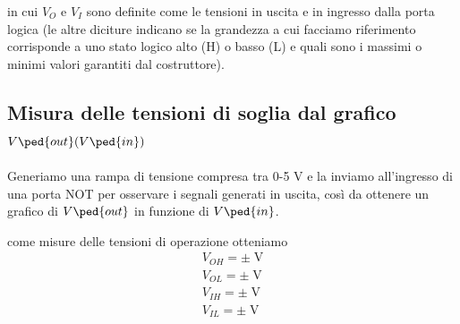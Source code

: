 \documentclass[10pt, a4paper, italian]{article}
\begin{document}
in cui $V_O$ e $V_I$ sono definite come le tensioni in uscita e in ingresso
dalla porta logica (le altre diciture indicano se la grandezza a cui facciamo
riferimento corrisponde a uno stato logico alto (H) o basso (L) e quali sono
i massimi o minimi valori garantiti dal costruttore).

\subsection{Misura delle tensioni di soglia dal grafico
$V\ped{out}(V\ped{in})$}
Generiamo una rampa di tensione compresa tra 0-5 V e la inviamo
all'ingresso di una porta NOT per osservare i segnali generati in uscita,
così da ottenere un grafico di $V\ped{out}$ in funzione di $V\ped{in}$.

come misure delle tensioni di operazione otteniamo
\begin{align*}
V_{OH} = \pm \; \si{\V} \\
V_{OL}= \pm \; \si{\V} \\
V_{IH} = \pm \; \si{\V} \\
V_{IL} = \pm \; \si{\V} \\
\end{align*}
\end{document}
